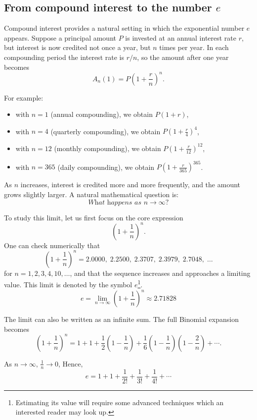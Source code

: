 \subsection{From compound interest to the number \texorpdfstring{$e$}{e}}

Compound interest provides a natural setting in which the exponential
number $e$ appears.  Suppose a principal amount $P$ is invested at an
annual interest rate $r$, but interest is now credited not once a year,
but $n$ times per year.  In each compounding period the interest rate is
$r/n$, so the amount after one year becomes
\[
A_n(1) = P\left(1 + \frac{r}{n}\right)^{n}.
\]

For example:
\begin{itemize}
    \item with $n=1$ (annual compounding), we obtain $P(1+r)$,
    \item with $n=4$ (quarterly compounding), we obtain
    $P\left(1+\frac{r}{4}\right)^4$,
    \item with $n=12$ (monthly compounding), we obtain
    $P\left(1+\frac{r}{12}\right)^{12}$,
    \item with $n=365$ (daily compounding), we obtain
    $P\left(1+\frac{r}{365}\right)^{365}$.
\end{itemize}

As $n$ increases, interest is credited more and more frequently, and the
amount grows slightly larger.  A natural mathematical question is:
\[
\textit{What happens as } n \to \infty?
\]

\medskip
\noindent
To study this limit, let us first focus on the core expression
\[
\left(1 + \frac{1}{n}\right)^{n}.
\]
One can check numerically that
\[
\left(1+\frac{1}{n}\right)^n
=
2.0000,\; 2.2500,\; 2.3707,\; 2.3979,\; 2.7048,\;\dots
\]
for $n=1,2,3,4,10,\dots$, and that the sequence increases and approaches
a limiting value.  This limit is denoted by the symbol $e$\footnote{Estimating its value will require some advanced techniques which an interested reader may look up.}.
\[
e = \lim_{n\to\infty}\left(1+\frac{1}{n}\right)^{n} \approx  2.71828
\]

The limit can also be written as an infinite sum. The full Binomial expansion becomes
\[
\left(1+\frac{1}{n}\right)^{n}
=
1
+ 1
+ \frac{1}{2}\left(1-\frac{1}{n}\right)
+ \frac{1}{6}\left(1-\frac{1}{n}\right)\left(1-\frac{2}{n}\right)
+ \cdots.
\]

As $n\to\infty$, $\frac{1}{n}\to 0$, Hence,
\[
e = 1 + 1 + \frac{1}{2!} +  \frac{1}{3!} +  \frac{1}{4!} + \cdots
\]

